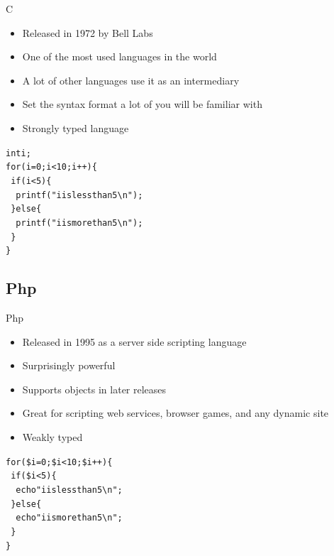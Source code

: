 \documentclass[10pt]{beamer}
\begin{document}
\begin{frame}{C}

	\begin{itemize}
		\item Released in 1972 by Bell Labs
		\item One of the most used languages in the world
		\item A lot of other languages use it as an intermediary
		\item Set the syntax format a lot of you will be familiar with
		\item Strongly typed language
	\end{itemize}
	
	\begin{alltt}
	int i; \\
	for(i=0;i<10;i++) \{ \\
		~if(i<5) \{        \\
			~~printf("i is less than 5 \textbackslash n"); \\
		~\} else \{                                      \\
			~~printf("i is more than 5 \textbackslash n"); \\
		~\} \\
	\} \\
	\end{alltt}

\end{frame}

\subsection{Php}

\begin{frame}{Php}

	\begin{itemize}
		\item Released in 1995 as a server side scripting language
		\item Surprisingly powerful
		\item Supports objects in later releases
		\item Great for scripting web services, browser games, and any dynamic site
		\item Weakly typed
	\end{itemize}
	
	\begin{alltt}
	for(\$i=0;\$i<10;\$i++) \{ \\
		~if(\$i<5) \{        \\
			~~echo "i is less than 5 \textbackslash n"; \\
		~\} else \{                                      \\
			~~echo "i is more than 5 \textbackslash n"; \\
		~\} \\
	\} \\
	\end{alltt}

\end{frame}
\end{document}
